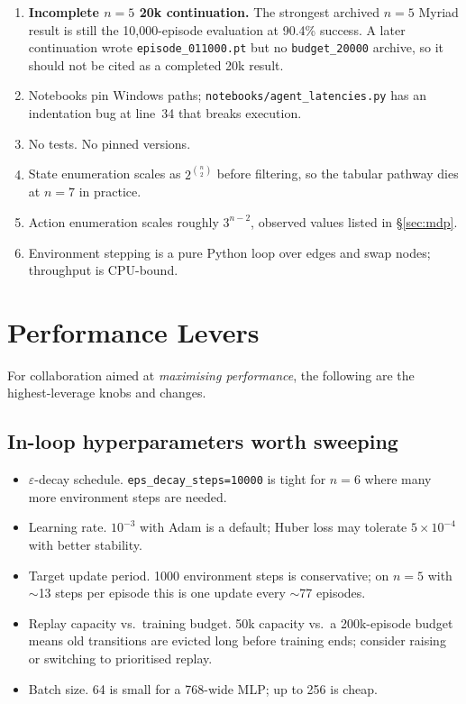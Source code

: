 \documentclass[11pt]{article}
\newcommand{\code}[1]{\texttt{#1}}
\newcommand{\file}[1]{\texttt{\small #1}}
\begin{document}
\begin{enumerate}
  \item \textbf{Incomplete $n=5$ 20k continuation.} The strongest archived $n=5$ Myriad result is still the 10{,}000-episode evaluation at 90.4\% success. A later continuation wrote \file{episode\_011000.pt} but no \file{budget\_20000} archive, so it should not be cited as a completed 20k result.
  \item Notebooks pin Windows paths; \file{notebooks/agent\_latencies.py} has an indentation bug at line~34 that breaks execution.
  \item No tests. No pinned versions.
  \item State enumeration scales as $2^{\binom{n}{2}}$ before filtering, so the tabular pathway dies at $n=7$ in practice.
  \item Action enumeration scales roughly $3^{n-2}$, observed values listed in \S\ref{sec:mdp}.
  \item Environment stepping is a pure Python loop over edges and swap nodes; throughput is CPU-bound.
\end{enumerate}

\section{Performance Levers}
\label{sec:performance}

For collaboration aimed at \emph{maximising performance}, the following are the highest-leverage knobs and changes.

\subsection{In-loop hyperparameters worth sweeping}
\begin{itemize}
  \item $\varepsilon$-decay schedule. \code{eps\_decay\_steps=10000} is tight for $n=6$ where many more environment steps are needed.
  \item Learning rate. $10^{-3}$ with Adam is a default; Huber loss may tolerate $5\times10^{-4}$ with better stability.
  \item Target update period. 1000 environment steps is conservative; on $n=5$ with $\sim$13 steps per episode this is one update every $\sim$77 episodes.
  \item Replay capacity vs.\ training budget. 50k capacity vs.\ a 200k-episode budget means old transitions are evicted long before training ends; consider raising or switching to prioritised replay.
  \item Batch size. 64 is small for a 768-wide MLP; up to 256 is cheap.
\end{itemize}
\end{document}
